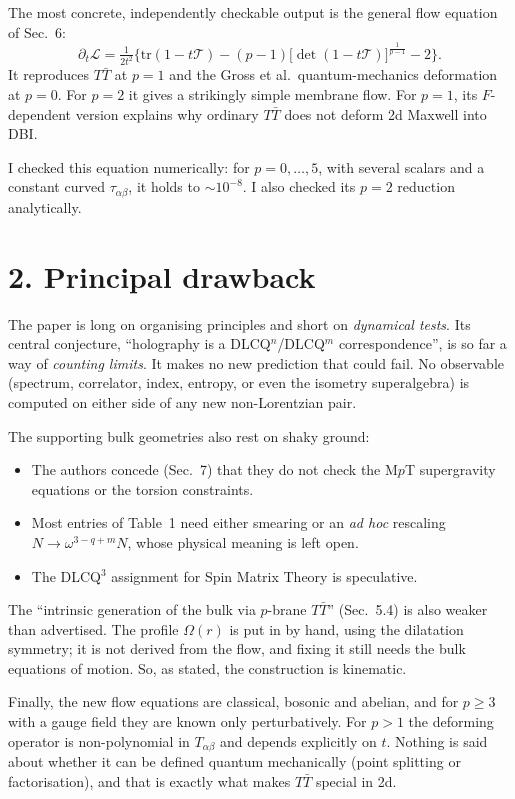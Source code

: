 \documentclass[11pt]{article}
\begin{document}
The most concrete, independently checkable output is the general flow equation of Sec.~6:
\[
\partial_t\mathcal L=\tfrac{1}{2t^2}\Big\{\mathrm{tr}(1-t\mathcal T)-(p-1)\big[\det(1-t\mathcal T)\big]^{\frac1{p-1}}-2\Big\}.
\]
It reproduces $T\bar T$ at $p=1$ and the Gross et al.\ quantum-mechanics deformation at $p=0$.
For $p=2$ it gives a strikingly simple membrane flow. For $p=1$, its $F$-dependent version explains
why ordinary $T\bar T$ does not deform 2d Maxwell into DBI.

I checked this equation numerically: for $p=0,\dots,5$, with several scalars and a constant curved
$\tau_{\alpha\beta}$, it holds to $\sim\!10^{-8}$. I also checked its $p=2$ reduction
analytically.

\section*{2. Principal drawback}

The paper is long on organising principles and short on \emph{dynamical tests}.
Its central conjecture, ``holography is a DLCQ$^n$/DLCQ$^m$ correspondence'', is so far a way of
\emph{counting limits}. It makes no new prediction that could fail. No observable (spectrum,
correlator, index, entropy, or even the isometry superalgebra) is computed on either side of any
new non-Lorentzian pair.

The supporting bulk geometries also rest on shaky ground:
\begin{itemize}
\item The authors concede (Sec.~7) that they do not check the M$p$T supergravity equations or the
torsion constraints.
\item Most entries of Table~1 need either smearing or an \emph{ad hoc} rescaling
$N\to\omega^{3-q+m}N$, whose physical meaning is left open.
\item The DLCQ$^3$ assignment for Spin Matrix Theory is speculative.
\end{itemize}

The ``intrinsic generation of the bulk via $p$-brane $T\bar T$'' (Sec.~5.4) is also weaker than
advertised. The profile $\Omega(r)$ is put in by hand, using the dilatation symmetry; it is not
derived from the flow, and fixing it still needs the bulk equations of motion. So, as stated, the
construction is kinematic.

Finally, the new flow equations are classical, bosonic and abelian, and for $p\ge3$ with a gauge
field they are known only perturbatively. For $p>1$ the deforming operator is non-polynomial in
$T_{\alpha\beta}$ and depends explicitly on $t$. Nothing is said about whether it can be defined
quantum mechanically (point splitting or factorisation), and that is exactly what makes
$T\bar T$ special in 2d.
\end{document}
